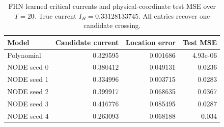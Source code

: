 \begin{table}[tb]
\centering\small
\caption{FHN learned critical currents and physical-coordinate test MSE over $T=20$. True current $I_H=0.33128133745$. All entries recover one candidate crossing.}\label{tab:fhn}
\begin{tabular}{lrrr}\toprule
Model & Candidate current & Location error & Test MSE \\
\midrule
Polynomial & 0.329595 & 0.001686 & 4.93e-06 \\
NODE seed 0 & 0.380412 & 0.049131 & 0.0236 \\
NODE seed 1 & 0.334996 & 0.003715 & 0.0283 \\
NODE seed 2 & 0.399917 & 0.068635 & 0.0367 \\
NODE seed 3 & 0.416776 & 0.085495 & 0.0287 \\
NODE seed 4 & 0.263093 & 0.068188 & 0.034 \\
\bottomrule\end{tabular}
\end{table}
